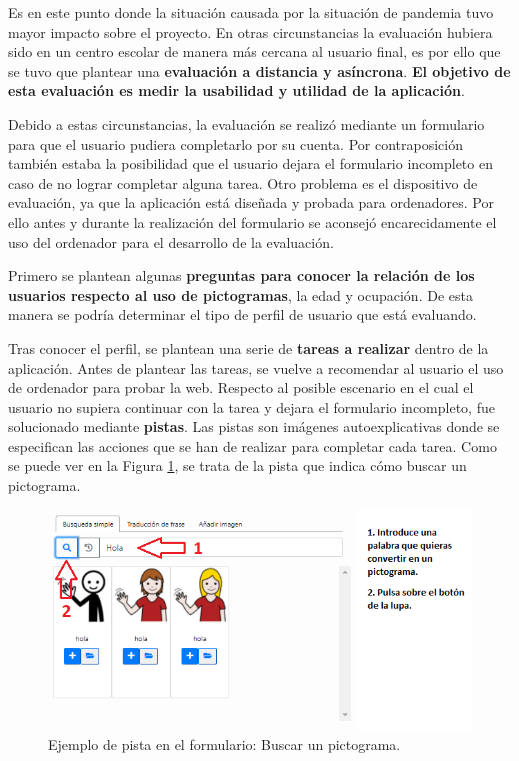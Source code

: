 Es en este punto donde la situación causada por la situación de pandemia tuvo mayor impacto sobre el proyecto. En otras circunstancias la evaluación hubiera sido en un centro escolar de manera más cercana al usuario final, es por ello que se tuvo que plantear una \textbf{evaluación a distancia y asíncrona}. \textbf{El objetivo de esta evaluación es medir la usabilidad y utilidad de la aplicación}. 


Debido a estas circunstancias, la evaluación se realizó mediante un formulario para que el usuario pudiera completarlo por su cuenta. Por contraposición también estaba la posibilidad que el usuario dejara el formulario incompleto en caso de no lograr completar alguna tarea. Otro problema es el dispositivo de evaluación, ya que la aplicación está diseñada y probada para ordenadores. Por ello antes y durante la realización del formulario se aconsejó encarecidamente el uso del ordenador para el desarrollo de la evaluación. 

Primero se plantean algunas\textbf{ preguntas para conocer la relación de los usuarios respecto al uso de pictogramas}, la edad y ocupación. De esta manera se podría determinar el tipo de perfil de usuario que está evaluando.

Tras conocer el perfil, se plantean una serie de\textbf{ tareas a realizar} dentro de la aplicación. Antes de plantear las tareas, se vuelve a recomendar al usuario el uso de ordenador para probar la web. Respecto al  posible escenario en el cual el usuario no supiera continuar con la tarea y dejara el formulario incompleto, fue solucionado mediante \textbf{pistas}. Las pistas son imágenes autoexplicativas donde se especifican las acciones que se han de realizar para completar cada tarea. Como se puede ver en la Figura \ref{fig:evaPista}, se trata de la pista que indica cómo buscar un pictograma.

\begin{figure}[h!]
	\centering
	\includegraphics[width=0.8\linewidth]{Imagenes/Bitmap/evaluacionPista}
	\caption{ Ejemplo de pista en el formulario: Buscar un pictograma.
	}
	\label{fig:evaPista}
\end{figure} 

